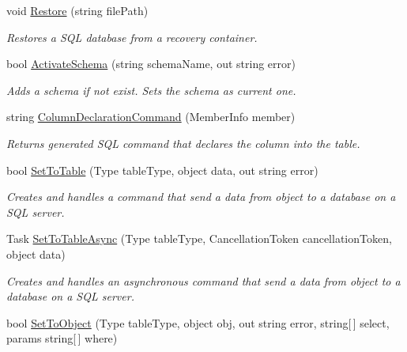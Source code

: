 \begin{DoxyCompactItemize}
void \mbox{\hyperlink{interface_uniform_data_operator_1_1_sql_1_1_i_sql_operator_acf6fdbfc57a21efc371e0772244defd5}{Restore}} (string file\+Path)
\begin{DoxyCompactList}\small\item\em Restores a S\+QL database from a recovery container. \end{DoxyCompactList}\item 
bool \mbox{\hyperlink{interface_uniform_data_operator_1_1_sql_1_1_i_sql_operator_a5ae8328a464ef80f1ae1bd46a573c265}{Activate\+Schema}} (string schema\+Name, out string error)
\begin{DoxyCompactList}\small\item\em Adds a schema if not exist. Sets the schema as current one. \end{DoxyCompactList}\item 
string \mbox{\hyperlink{interface_uniform_data_operator_1_1_sql_1_1_i_sql_operator_aac9c3ed1e73af66e383340a154786ec7}{Column\+Declaration\+Command}} (Member\+Info member)
\begin{DoxyCompactList}\small\item\em Returns generated S\+QL command that declares the column into the table. \end{DoxyCompactList}\item 
bool \mbox{\hyperlink{interface_uniform_data_operator_1_1_sql_1_1_i_sql_operator_ad05106eb6bd1a50f35b476a42821dfa3}{Set\+To\+Table}} (Type table\+Type, object data, out string error)
\begin{DoxyCompactList}\small\item\em Creates and handles a command that send a data from object to a database on a S\+QL server. \end{DoxyCompactList}\item 
Task \mbox{\hyperlink{interface_uniform_data_operator_1_1_sql_1_1_i_sql_operator_a35ef3899954f213e391751e9cda09322}{Set\+To\+Table\+Async}} (Type table\+Type, Cancellation\+Token cancellation\+Token, object data)
\begin{DoxyCompactList}\small\item\em Creates and handles an asynchronous command that send a data from object to a database on a S\+QL server. \end{DoxyCompactList}\item 
bool \mbox{\hyperlink{interface_uniform_data_operator_1_1_sql_1_1_i_sql_operator_a9a1822fcafcb1a3abd59b40f2cef7930}{Set\+To\+Object}} (Type table\+Type, object obj, out string error, string\mbox{[}$\,$\mbox{]} select, params string\mbox{[}$\,$\mbox{]} where)

\end{DoxyCompactItemize}
